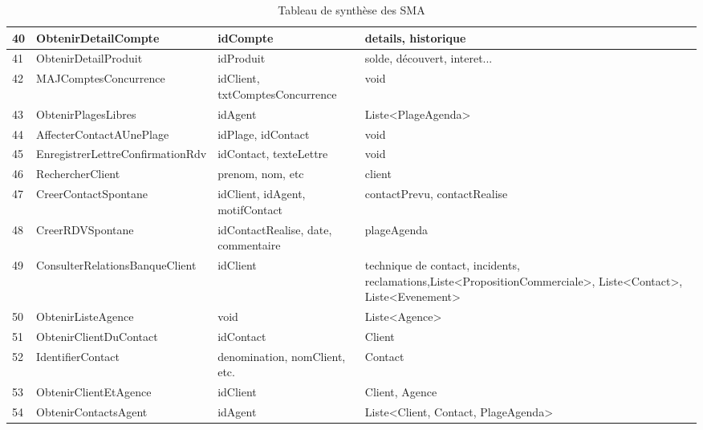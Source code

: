 \begin{table}[H]
{\begin{tabular}{p{1cm}|p{5cm}p{6cm}p{6cm}}
			40 & ObtenirDetailCompte & idCompte &  details, historique \\ \hline
			41 & ObtenirDetailProduit & idProduit &  solde, découvert, interet... \\ \hline
			42 & MAJComptesConcurrence & idClient, txtComptesConcurrence &  void  \\ \hline
			43 & ObtenirPlagesLibres & idAgent &  Liste<PlageAgenda> \\ \hline
			44 & AffecterContactAUnePlage & idPlage, idContact &  void \\ \hline
			45 & EnregistrerLettreConfirmationRdv & idContact, texteLettre &  void \\ \hline
			46 & RechercherClient & prenom, nom, etc &  client \\ \hline
			47 & CreerContactSpontane & idClient, idAgent, motifContact &  contactPrevu, contactRealise \\ \hline
			48 & CreerRDVSpontane & idContactRealise, date, commentaire &  plageAgenda \\ \hline
			49 & ConsulterRelationsBanqueClient & idClient &  technique de contact, incidents, reclamations,Liste<PropositionCommerciale>, Liste<Contact>, Liste<Evenement>  \\ \hline
			50 & ObtenirListeAgence & void &  Liste<Agence> \\ \hline
			51 & ObtenirClientDuContact & idContact &  Client \\ \hline
			52 & IdentifierContact & denomination, nomClient, etc. &  Contact \\ \hline
			53 & ObtenirClientEtAgence & idClient &  Client, Agence \\ \hline
			54 & ObtenirContactsAgent & idAgent &  Liste<Client, Contact, PlageAgenda> \\ \hline
		\end{tabular}
	}
	\caption{Tableau de synthèse des SMA}
\end{table}

